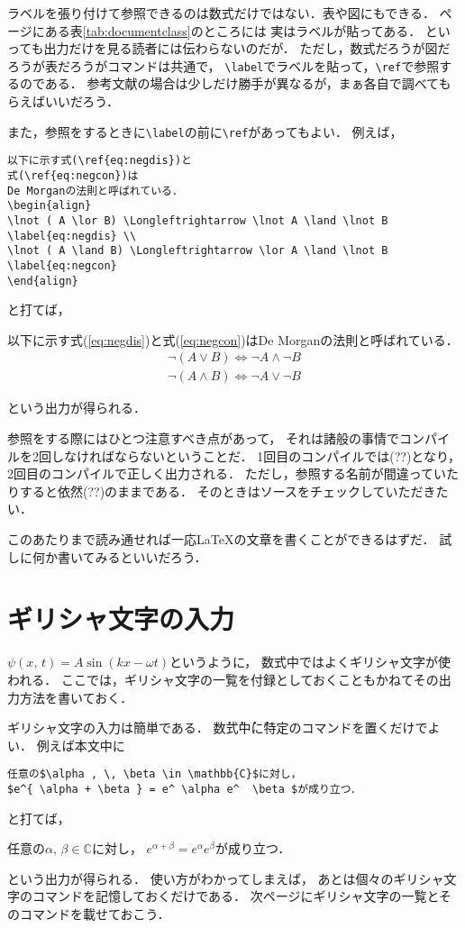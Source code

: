 ラベルを張り付けて参照できるのは数式だけではない．表や図にもできる．
\pageref{tab:documentclass}ページにある表\ref{tab:documentclass}のところには
実はラベルが貼ってある．
といっても出力だけを見る読者には伝わらないのだが．
ただし，数式だろうが図だろうが表だろうがコマンドは共通で，
\verb|\label|でラベルを貼って，\verb|\ref|で参照するのである．
参考文献の場合は少しだけ勝手が異なるが，まぁ各自で調べてもらえばいいだろう．

また，参照をするときに\verb|\label|の前に\verb|\ref|があってもよい．
例えば，
\begin{verbatim}
以下に示す式(\ref{eq:negdis})と
式(\ref{eq:negcon})は
De Morganの法則と呼ばれている．
\begin{align}
\lnot ( A \lor B) \Longleftrightarrow \lnot A \land \lnot B 
\label{eq:negdis} \\
\lnot ( A \land B) \Longleftrightarrow \lor A \land \lnot B 
\label{eq:negcon}
\end{align}
\end{verbatim}
と打てば，
\begin{oframed}
以下に示す式(\ref{eq:negdis})と式(\ref{eq:negcon})はDe Morganの法則と呼ばれている．
\begin{align}
\lnot ( A \lor B) \Longleftrightarrow \lnot A \land \lnot B 
\label{eq:negdis} \\
\lnot ( A \land B) \Longleftrightarrow \lnot A \lor \lnot B 
\label{eq:negcon}
\end{align}
\end{oframed}
という出力が得られる．

参照をする際にはひとつ注意すべき点があって，
それは諸般の事情でコンパイルを2回しなければならないということだ．
1回目のコンパイルでは(??)となり，2回目のコンパイルで正しく出力される．
ただし，参照する名前が間違っていたりすると依然(??)のままである．
そのときはソースをチェックしていただきたい．

このあたりまで読み通せれば一応{\LaTeX}の文章を書くことができるはずだ．
試しに何か書いてみるといいだろう．

\section{ギリシャ文字の入力}
$\psi (x, \, t) = A \sin (kx-\omega t)$というように，
数式中ではよくギリシャ文字が使われる．
ここでは，ギリシャ文字の一覧を付録としておくこともかねてその出力方法を書いておく．

ギリシャ文字の入力は簡単である．
\.数\.式\.中\.に特定のコマンドを置くだけでよい．
例えば本文中に
\begin{verbatim}
任意の$\alpha , \, \beta \in \mathbb{C}$に対し，
$e^{ \alpha + \beta } = e^ \alpha e^  \beta $が成り立つ．
\end{verbatim}
と打てば，
\begin{oframed}
任意の$\alpha , \, \beta \in \mathbb{C}$に対し，
$e^{ \alpha + \beta } = e^ \alpha e^  \beta $が成り立つ．
\end{oframed}
という出力が得られる．
使い方がわかってしまえば，
あとは個々のギリシャ文字のコマンドを記憶しておくだけである．
次ページにギリシャ文字の一覧とそのコマンドを載せておこう．

